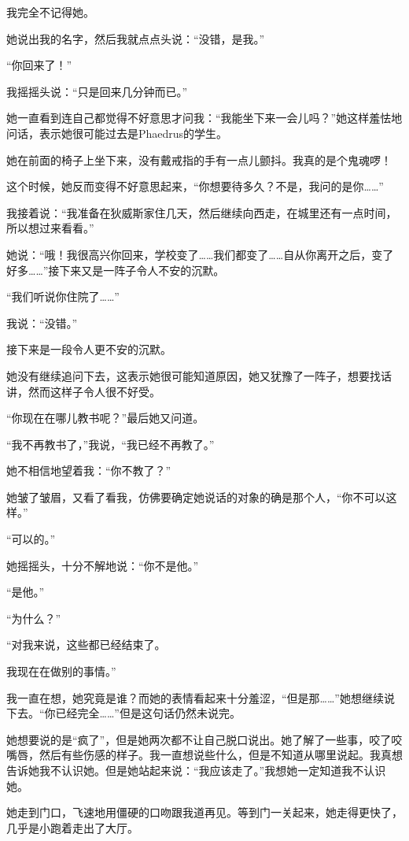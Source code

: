 \documentclass[UTF8]{article}
\begin{document}
\par 我完全不记得她。
\par 她说出我的名字，然后我就点点头说：“没错，是我。”
\par “你回来了！”
\par 我摇摇头说：“只是回来几分钟而已。”
\par 她一直看到连自己都觉得不好意思才问我：“我能坐下来一会儿吗？”她这样羞怯地问话，表示她很可能过去是Phaedrus的学生。
\par 她在前面的椅子上坐下来，没有戴戒指的手有一点儿颤抖。我真的是个鬼魂啰！
\par 这个时候，她反而变得不好意思起来，“你想要待多久？不是，我问的是你……”
\par 我接着说：“我准备在狄威斯家住几天，然后继续向西走，在城里还有一点时间，所以想过来看看。”
\par 她说：“哦！我很高兴你回来，学校变了……我们都变了……自从你离开之后，变了好多……”接下来又是一阵子令人不安的沉默。
\par “我们听说你住院了……”
\par 我说：“没错。”
\par 接下来是一段令人更不安的沉默。
\par 她没有继续追问下去，这表示她很可能知道原因，她又犹豫了一阵子，想要找话讲，然而这样子令人很不好受。
\par “你现在在哪儿教书呢？”最后她又问道。
\par “我不再教书了，”我说，“我已经不再教了。”
\par 她不相信地望着我：“你不教了？”
\par 她皱了皱眉，又看了看我，仿佛要确定她说话的对象的确是那个人，“你不可以这样。”
\par “可以的。”
\par 她摇摇头，十分不解地说：“你不是他。”
\par “是他。”
\par “为什么？”
\par “对我来说，这些都已经结束了。
\par 我现在在做别的事情。”
\par 我一直在想，她究竟是谁？而她的表情看起来十分羞涩，“但是那……”她想继续说下去。“你已经完全……”但是这句话仍然未说完。
\par 她想要说的是“疯了”，但是她两次都不让自己脱口说出。她了解了一些事，咬了咬嘴唇，然后有些伤感的样子。我一直想说些什么，但是不知道从哪里说起。我真想告诉她我不认识她。但是她站起来说：“我应该走了。”我想她一定知道我不认识她。
\par 她走到门口，飞速地用僵硬的口吻跟我道再见。等到门一关起来，她走得更快了，几乎是小跑着走出了大厅。
\end{document}
